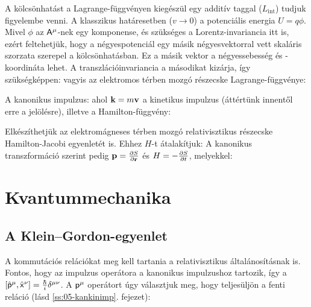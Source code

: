    A kölcsönhatást a Lagrange-függvényen kiegészül egy additív taggal ($L_\text{int}$) tudjuk figyelembe venni. A klasszikus határesetben ($v\to 0$) a potenciális energia $U=q\phi$. Mivel $\phi$ az $\mathsf{A}^\mu$-nek egy komponense, és szükséges a Lorentz-invariancia itt is, ezért feltehetjük, hogy a négyespotenciál egy másik négyesvektorral vett skaláris szorzata szerepel a kölcsönhatásban. Ez a másik vektor a négyessebesség és -koordináta lehet. A transzlációinvariancia a másodikat kizárja, így szükségképpen:
   vagyis az elektromos térben mozgó részecske Lagrange-függvénye:
   
   A kanonikus impulzus:
   ahol $\mathbf{k}=m\mathbf{v}$ a kinetikus impulzus (áttértünk innentől erre a jelölésre), illetve a Hamilton-függvény:
   
   Elkészíthetjük az elektromágneses térben mozgó relativisztikus részecske Hamilton-Jacobi egyenletét is. Ehhez $H$-t átalakítjuk:
   A kanonikus transzformáció szerint pedig $\mathbf{p}=\frac{\partial S}{\partial \mathbf{r}}$ és $H=-\frac{\partial S}{\partial t}$, melyekkel:
   
 \section{Kvantummechanika}\label{ss:02-kvantum}
   
  \subsection{A Klein--Gordon-egyenlet}
   
   A kommutációs relációkat meg kell tartania a relativisztikus általánosításnak is. Fontos, hogy az impulzus operátora a kanonikus impulzushoz tartozik, így a $[\hat{\mathsf{p}}^\mu,\hat{\mathsf{x}}^\nu]=\frac{\hbar}{i}\delta^{\mu\nu}$. A $\mathsf{p}^\mu$ operátort úgy választjuk meg, hogy teljesüljön a fenti reláció (lásd \ref{ss:05-kankinimp}. fejezet):
   
